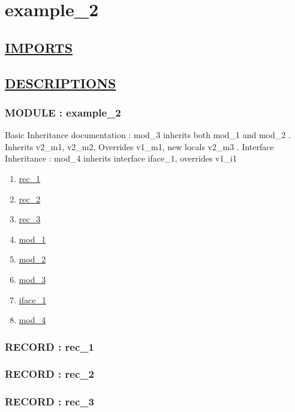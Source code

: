 \chapter*{example\_2}

\section*{\underline{IMPORTS}}

\section*{\underline{DESCRIPTIONS}}
\subsection*{MODULE : example\_2}
\hypertarget{ecldoc:example_2_example_2}{}
Basic Inheritance documentation : mod\_3 inherits both mod\_1 and mod\_2 . Inherits v2\_m1, v2\_m2, Overrides v1\_m1, new locals v2\_m3 . Interface Inheritance : mod\_4 inherits interface iface\_1, overrides v1\_i1 \\
\begin{enumerate}
\item \hyperlink{ecldoc:example_2_example_2.rec_1}{rec\_1}
\item \hyperlink{ecldoc:example_2_example_2.rec_2}{rec\_2}
\item \hyperlink{ecldoc:example_2_example_2.rec_3}{rec\_3}
\item \hyperlink{ecldoc:example_2_example_2.mod_1}{mod\_1}
\item \hyperlink{ecldoc:example_2_example_2.mod_2}{mod\_2}
\item \hyperlink{ecldoc:example_2_example_2.mod_3}{mod\_3}
\item \hyperlink{ecldoc:example_2_example_2.iface_1}{iface\_1}
\item \hyperlink{ecldoc:example_2_example_2.mod_4}{mod\_4}
\end{enumerate}
\subsection*{RECORD : rec\_1}
\hypertarget{ecldoc:example_2_example_2.rec_1}{}
\subsection*{RECORD : rec\_2}
\hypertarget{ecldoc:example_2_example_2.rec_2}{}
\subsection*{RECORD : rec\_3}
\hypertarget{ecldoc:example_2_example_2.rec_3}{}
